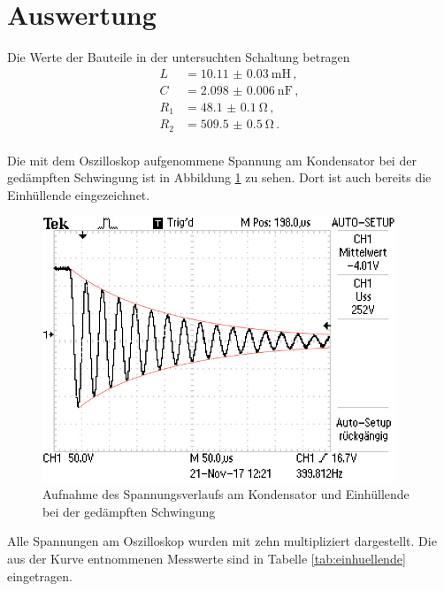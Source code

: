 \section{Auswertung}
\label{sec:Auswertung}

Die Werte der Bauteile in der untersuchten Schaltung betragen
\begin{align*}
  L &= \SI{10.11(003)}{\milli\henry}\,, \\
  C &= \SI{2.098(0006)}{\nano\farad}\,, \\
  R_1 &= \SI{48.1(01)}{\ohm}\,, \\
  R_2 &= \SI{509.5(05)}{\ohm}\,. \\
\end{align*}

Die mit dem Oszilloskop aufgenommene Spannung am Kondensator bei der gedämpften
Schwingung ist in Abbildung \ref{fig:einhuellende} zu sehen. Dort ist auch
bereits die Einhüllende eingezeichnet.

\begin{figure}
  \centering
  \includegraphics[width=300pt]{data/gedaempfte_schwingung2.JPG}
  \caption{Aufnahme des Spannungsverlaufs am Kondensator und Einhüllende bei der
  gedämpften Schwingung}
  \label{fig:einhuellende}
\end{figure}

Alle Spannungen am Oszilloskop wurden mit zehn
multipliziert dargestellt. Die aus der Kurve entnommenen Messwerte sind in Tabelle
\ref{tab:einhuellende} eingetragen.

